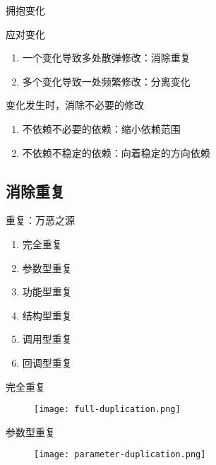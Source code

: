 \begin{frame}{拥抱变化}
  \begin{block}{应对变化} 
    \begin{enumerate}
    \item \alert{一个变化导致多处散弹修改}：消除重复
    \item \alert{多个变化导致一处频繁修改}：分离变化
    \end{enumerate}
  \end{block}

  \begin{block}{变化发生时，消除不必要的修改} 
    \begin{enumerate}
    \item \alert{不依赖不必要的依赖}：缩小依赖范围
    \item \alert{不依赖不稳定的依赖}：向着稳定的方向依赖
    \end{enumerate}
  \end{block}
\end{frame}

\subsection{消除重复}

\begin{frame}[fragile]{重复：万恶之源}
  \begin{enumerate}
    \item \alert{完全重复}
    \item \alert{参数型重复}
    \item \alert{功能型重复}    
    \item \alert{结构型重复}              
    \item \alert{调用型重复}
    \item \alert{回调型重复}            
  \end{enumerate}
\end{frame}

\begin{frame}[fragile]{完全重复}
  \begin{figure}
    \centering
    \texttt{[image: full-duplication.png]}
  \end{figure}
\end{frame}


\begin{frame}[fragile]{参数型重复}
  \begin{figure}
    \centering
    \texttt{[image: parameter-duplication.png]}
  \end{figure}
\end{frame}

